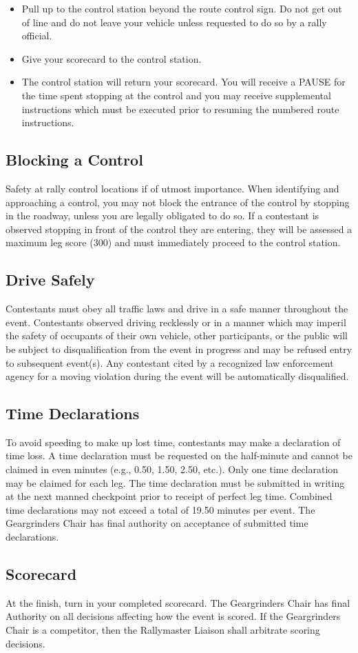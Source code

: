 \begin{itemize}

\item Pull up to the control station beyond the route control sign. Do not get
out of line and do not leave your vehicle unless requested to do so by a rally
official.

\item Give your scorecard to the control station.

\item The control station will return your scorecard. You will receive a PAUSE
for the time spent stopping at the control and you may receive supplemental
instructions which must be executed prior to resuming the numbered route
instructions.

\end{itemize}

\subsection{Blocking a Control}
Safety at rally control locations if of utmost importance. When identifying and
approaching a control, you may not block the entrance of the control by stopping
in the roadway, unless you are legally obligated to do so. If a contestant is
observed stopping in front of the control they are entering, they will be
assessed a maximum leg score (300) and must immediately proceed to the control
station.

\subsection{Drive Safely}
Contestants must obey all traffic laws and drive in a safe manner throughout the
event. Contestants observed driving recklessly or in a manner which may imperil
the safety of occupants of their own vehicle, other participants, or the public
will be subject to disqualification from the event in progress and may be
refused entry to subsequent event(s). Any contestant cited by a recognized law
enforcement agency for a moving violation during the event will be automatically
disqualified.

\subsection{Time Declarations}
To avoid speeding to make up lost time, contestants may make a declaration of
time loss. A time declaration must be requested on the half-minute and cannot be
claimed in even minutes (e.g., 0.50, 1.50, 2.50, etc.). Only one time
declaration may be claimed for each leg. The time declaration must be submitted
in writing at the next manned checkpoint prior to receipt of perfect leg time.
Combined time declarations may not exceed a total of 19.50 minutes per event.
The Geargrinders Chair has final authority on acceptance of submitted time
declarations.

\subsection{Scorecard}
At the finish, turn in your completed scorecard. The Geargrinders Chair has
final Authority on all decisions affecting how the event is scored. If the
Geargrinders Chair is a competitor, then the Rallymaster Liaison shall arbitrate
scoring decisions.

